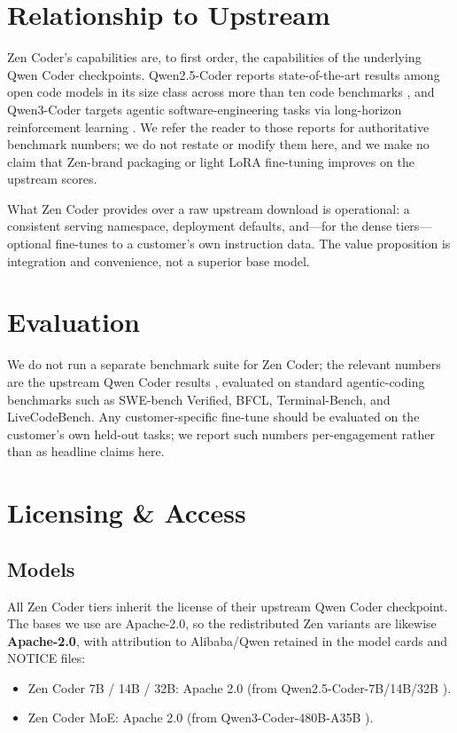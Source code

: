 \documentclass[11pt,a4paper]{article}
\begin{document}
\section{Relationship to Upstream}

Zen Coder's capabilities are, to first order, the capabilities of the underlying Qwen Coder
checkpoints. Qwen2.5-Coder reports state-of-the-art results among open code models in its size class
across more than ten code benchmarks \cite{qwen25coder}, and Qwen3-Coder targets agentic
software-engineering tasks via long-horizon reinforcement learning \cite{qwen3coder}. We refer the
reader to those reports for authoritative benchmark numbers; we do not restate or modify them here, and
we make no claim that Zen-brand packaging or light LoRA fine-tuning improves on the upstream scores.

What Zen Coder provides over a raw upstream download is operational: a consistent serving namespace,
deployment defaults, and---for the dense tiers---optional fine-tunes to a customer's own instruction
data. The value proposition is integration and convenience, not a superior base model.

\section{Evaluation}

We do not run a separate benchmark suite for Zen Coder; the relevant numbers are the upstream Qwen
Coder results \cite{qwen25coder,qwen3coder}, evaluated on standard agentic-coding benchmarks such as
SWE-bench Verified, BFCL, Terminal-Bench, and LiveCodeBench. Any customer-specific fine-tune should be
evaluated on the customer's own held-out tasks; we report such numbers per-engagement rather than as
headline claims here.

\section{Licensing \& Access}

\subsection{Models}
All Zen Coder tiers inherit the license of their upstream Qwen Coder checkpoint. The bases we use are
Apache-2.0, so the redistributed Zen variants are likewise \textbf{Apache-2.0}, with attribution to
Alibaba/Qwen retained in the model cards and NOTICE files:

\begin{itemize}
    \item Zen Coder 7B / 14B / 32B: Apache 2.0 (from Qwen2.5-Coder-7B/14B/32B \cite{qwen25coder}).
    \item Zen Coder MoE: Apache 2.0 (from Qwen3-Coder-480B-A35B \cite{qwen3coder}).
\end{itemize}
\end{document}
